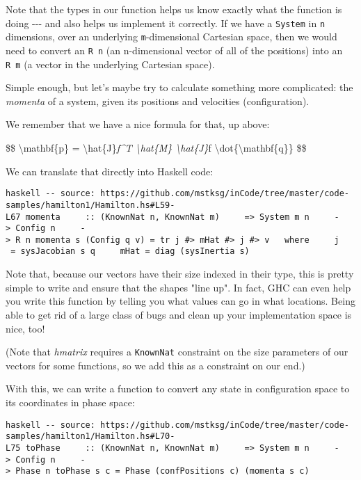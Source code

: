 \documentclass[]{article}
\begin{document}
Note that the types in our function helps us know exactly what the function is
doing -\/-\/- and also helps us implement it correctly. If we have a
\texttt{System} in \texttt{n} dimensions, over an underlying
\texttt{m}-dimensional Cartesian space, then we would need to convert an
\texttt{R\ n} (an n-dimensional vector of all of the positions) into an
\texttt{R\ m} (a vector in the underlying Cartesian space).

Simple enough, but let's maybe try to calculate something more complicated: the
\emph{momenta} of a system, given its positions and velocities (configuration).

We remember that we have a nice formula for that, up above:

\$\$ \textbackslash{}mathbf\{p\} = \textbackslash{}hat\{J\}\emph{f\^{}T
\textbackslash{}hat\{M\} \textbackslash{}hat\{J\}}f
\textbackslash{}dot\{\textbackslash{}mathbf\{q\}\} \$\$

We can translate that directly into Haskell code:

\texttt{haskell\ -\/-\ source:\ https://github.com/mstksg/inCode/tree/master/code-samples/hamilton1/Hamilton.hs\#L59-L67\ momenta\ \ \ \ \ ::\ (KnownNat\ n,\ KnownNat\ m)\ \ \ \ \ =\textgreater{}\ System\ m\ n\ \ \ \ \ -\textgreater{}\ Config\ n\ \ \ \ \ -\textgreater{}\ R\ n\ momenta\ s\ (Config\ q\ v)\ =\ tr\ j\ \#\textgreater{}\ mHat\ \#\textgreater{}\ j\ \#\textgreater{}\ v\ \ \ where\ \ \ \ \ j\ \ \ \ =\ sysJacobian\ s\ q\ \ \ \ \ mHat\ =\ diag\ (sysInertia\ s)}

Note that, because our vectors have their size indexed in their type, this is
pretty simple to write and ensure that the shapes "line up". In fact, GHC can
even help you write this function by telling you what values can go in what
locations. Being able to get rid of a large class of bugs and clean up your
implementation space is nice, too!

(Note that \emph{hmatrix} requires a \texttt{KnownNat} constraint on the size
parameters of our vectors for some functions, so we add this as a constraint on
our end.)

With this, we can write a function to convert any state in configuration space
to its coordinates in phase space:

\texttt{haskell\ -\/-\ source:\ https://github.com/mstksg/inCode/tree/master/code-samples/hamilton1/Hamilton.hs\#L70-L75\ toPhase\ \ \ \ \ ::\ (KnownNat\ n,\ KnownNat\ m)\ \ \ \ \ =\textgreater{}\ System\ m\ n\ \ \ \ \ -\textgreater{}\ Config\ n\ \ \ \ \ -\textgreater{}\ Phase\ n\ toPhase\ s\ c\ =\ Phase\ (confPositions\ c)\ (momenta\ s\ c)}
\end{document}
